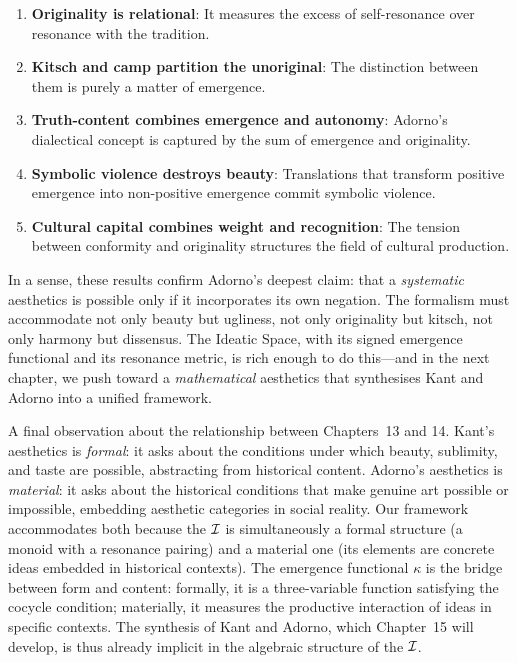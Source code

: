 \begin{enumerate}
\item \textbf{Originality is relational}: It measures the excess of
self-resonance over resonance with the tradition.

\item \textbf{Kitsch and camp partition the unoriginal}: The distinction
between them is purely a matter of emergence.

\item \textbf{Truth-content combines emergence and autonomy}: Adorno's
dialectical concept is captured by the sum of emergence and originality.

\item \textbf{Symbolic violence destroys beauty}: Translations that
transform positive emergence into non-positive emergence commit symbolic
violence.

\item \textbf{Cultural capital combines weight and recognition}: The
tension between conformity and originality structures the field of
cultural production.
\end{enumerate}

In a sense, these results confirm Adorno's deepest claim: that a
\emph{systematic} aesthetics is possible only if it incorporates its own
negation.  The formalism must accommodate not only beauty but ugliness,
not only originality but kitsch, not only harmony but dissensus.  The
Ideatic Space, with its signed emergence functional and its resonance
metric, is rich enough to do this---and in the next chapter, we push
toward a \emph{mathematical} aesthetics that synthesises Kant and Adorno
into a unified framework.

A final observation about the relationship between Chapters~13 and 14.
Kant's aesthetics is \emph{formal}: it asks about the conditions under which
beauty, sublimity, and taste are possible, abstracting from historical content.
Adorno's aesthetics is \emph{material}: it asks about the historical conditions
that make genuine art possible or impossible, embedding aesthetic categories
in social reality.  Our framework accommodates both because the $\mathcal{I}$ is
simultaneously a formal structure (a monoid with a resonance pairing) and a
material one (its elements are concrete ideas embedded in historical contexts).
The emergence functional $\kappa$ is the bridge between form and content:
formally, it is a three-variable function satisfying the cocycle condition;
materially, it measures the productive interaction of ideas in specific
contexts.  The synthesis of Kant and Adorno, which Chapter~15 will develop,
is thus already implicit in the algebraic structure of the $\mathcal{I}$.

